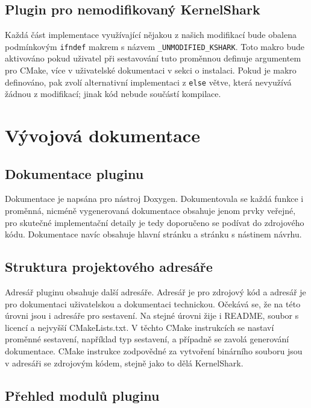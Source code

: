 \subsection{Plugin pro nemodifikovaný KernelShark}

Každá část implementace využívající nějakou z našich modifikací bude obalena podmínkovým \texttt{ifndef} makrem s názvem \texttt{\_UNMODIFIED\_KSHARK}. Toto makro bude aktivováno pokud uživatel při sestavování tuto proměnnou definuje argumentem pro CMake, více v uživatelské dokumentaci v sekci o instalaci. Pokud je makro definováno, pak zvolí alternativní implementaci z \texttt{else} větve, která nevyužívá žádnou z modifikací; jinak kód nebude součástí kompilace.

\section{Vývojová dokumentace}

\subsection*{Dokumentace pluginu}
Dokumentace je napsána pro nástroj Doxygen. Dokumentovala se každá funkce i proměnná, nicméně vygenerovaná dokumentace obsahuje jenom prvky veřejné, pro skutečné implementační detaily je tedy doporučeno se podívat do zdrojového kódu. Dokumentace navíc obsahuje hlavní stránku a stránku s nástinem návrhu.

\subsection*{Struktura projektového adresáře}

Adresář pluginu obsahuje další adresáře. Adresář  je pro zdrojový kód a adresář  je pro dokumentaci uživatelskou a dokumentaci technickou. Očekává se, že na této úrovni jsou i adresáře pro sestavení. Na stejné úrovni žije i README, soubor s licencí a nejvyšší CMakeLists.txt. V těchto CMake instrukcích se nastaví proměnné sestavení, například typ sestavení, a případně se zavolá generování dokumentace. CMake instrukce zodpovědné za vytvoření binárního souboru jsou v adresáři se zdrojovým kódem, stejně jako to dělá KernelShark.

\subsection*{Přehled modulů pluginu}

